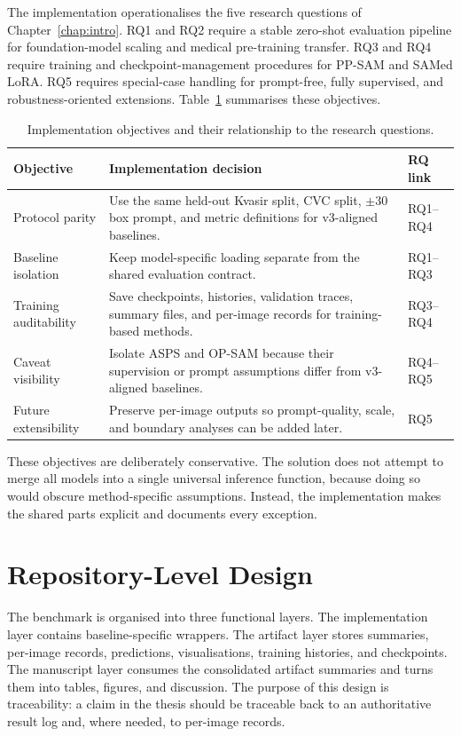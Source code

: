 The implementation operationalises the five research questions of Chapter~\ref{chap:intro}. RQ1 and RQ2 require a stable zero-shot evaluation pipeline for foundation-model scaling and medical pre-training transfer. RQ3 and RQ4 require training and checkpoint-management procedures for PP-SAM and SAMed LoRA. RQ5 requires special-case handling for prompt-free, fully supervised, and robustness-oriented extensions. Table~\ref{tab:implementation-objectives} summarises these objectives.

\begin{table}[H]
\centering
\caption{Implementation objectives and their relationship to the research questions.}
\label{tab:implementation-objectives}
\begin{tabular}{p{3.2cm}p{7.0cm}p{3.0cm}}
\toprule
\textbf{Objective} & \textbf{Implementation decision} & \textbf{RQ link} \\
\midrule
Protocol parity & Use the same held-out Kvasir split, CVC split, $\pm30$ box prompt, and metric definitions for v3-aligned baselines. & RQ1--RQ4 \\
Baseline isolation & Keep model-specific loading separate from the shared evaluation contract. & RQ1--RQ3 \\
Training auditability & Save checkpoints, histories, validation traces, summary files, and per-image records for training-based methods. & RQ3--RQ4 \\
Caveat visibility & Isolate ASPS and OP-SAM because their supervision or prompt assumptions differ from v3-aligned baselines. & RQ4--RQ5 \\
Future extensibility & Preserve per-image outputs so prompt-quality, scale, and boundary analyses can be added later. & RQ5 \\
\bottomrule
\end{tabular}
\end{table}

These objectives are deliberately conservative. The solution does not attempt to merge all models into a single universal inference function, because doing so would obscure method-specific assumptions. Instead, the implementation makes the shared parts explicit and documents every exception.

\section{Repository-Level Design}
\label{sec:repo-design}

The benchmark is organised into three functional layers. The implementation layer contains baseline-specific wrappers. The artifact layer stores summaries, per-image records, predictions, visualisations, training histories, and checkpoints. The manuscript layer consumes the consolidated artifact summaries and turns them into tables, figures, and discussion. The purpose of this design is traceability: a claim in the thesis should be traceable back to an authoritative result log and, where needed, to per-image records.

